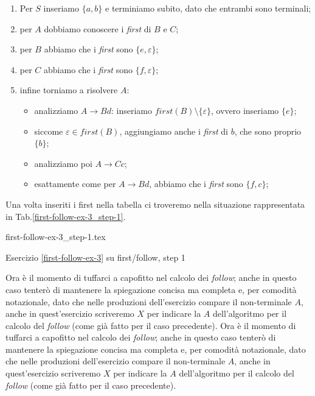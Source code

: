 \documentclass[class=book, crop=false, oneside, 12pt]{standalone}
\begin{document}
\begin{enumerate}
    \item Per \(S\) inseriamo \(\{a, b\}\) e terminiamo subito, dato che entrambi sono terminali;
    \item per \(A\) dobbiamo conoscere i \emph{first} di \(B\) e \(C\);
    \item per \(B\) abbiamo che i \emph{first} sono \(\{e, \varepsilon\}\);
    \item per \(C\) abbiamo che i \emph{first} sono \(\{f, \varepsilon\}\);
    \item infine torniamo a risolvere \(A\):
    \begin{itemize}
        \item analizziamo \(A \to Bd\): inseriamo \(first(B) \setminus \{\varepsilon\}\), ovvero inseriamo \(\{e\}\);
        \item siccome \(\varepsilon \in first(B)\), aggiungiamo anche i \emph{first} di \(b\), che sono proprio \(\{b\}\);
        \item analizziamo poi \(A \to Cc\);
        \item esattamente come per \(A \to Bd\), abbiamo che i \emph{first} sono \(\{f, c\}\);
    \end{itemize}
\end{enumerate}
Una volta inseriti i first nella tabella ci troveremo nella situazione rappresentata in Tab.\ref{first-follow-ex-3_step-1}.
\begin{table}[H]
	\centering
	{first-follow-ex-3_step-1.tex}
    \caption{Esercizio \ref{first-follow-ex-3} su first/follow, step 1}
    \label{first-follow-ex-3_step-1}
\end{table}
Ora è il momento di tuffarci a capofitto nel calcolo dei \emph{follow}; anche in questo caso tenterò di mantenere la spiegazione concisa ma completa e, per comodità notazionale, dato che nelle produzioni dell'esercizio compare il non-terminale \(A\), anche in quest'esercizio scriveremo \(X\) per indicare la \(A\) dell'algoritmo per il calcolo del \emph{follow} (come già fatto per il caso precedente). 
Ora è il momento di tuffarci a capofitto nel calcolo dei \emph{follow}; anche in questo caso tenterò di mantenere la spiegazione concisa ma completa e, per comodità notazionale, dato che nelle produzioni dell'esercizio compare il non-terminale \(A\), anche in quest'esercizio scriveremo \(X\) per indicare la \(A\) dell'algoritmo per il calcolo del \emph{follow} (come già fatto per il caso precedente). 
\end{document}
